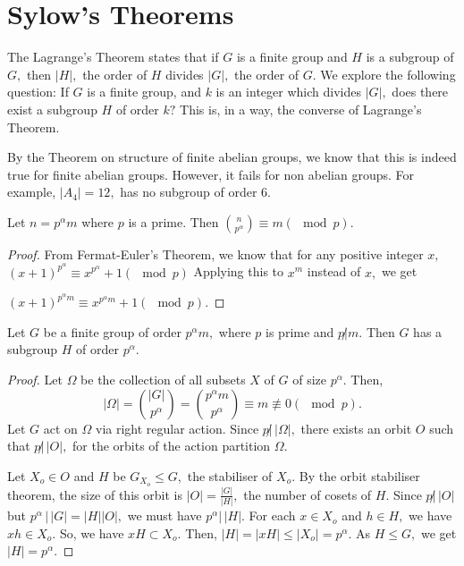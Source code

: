 \section{Sylow's Theorems}
The Lagrange's Theorem states that if $G$ is a finite group and $H$ is a subgroup of $G,$
then $ \lvert H \rvert,$ the order of $H$ divides $ \lvert G \rvert,$ the order of $G.$
We explore the following question: If $G$ is a finite group, and $k$ is an integer
which divides $ \lvert G \rvert ,$ does there exist a subgroup $H$ of order $k?$
This is, in a way, the converse of Lagrange's Theorem.

By the Theorem on structure of finite abelian groups, we know that this is indeed true
for finite abelian groups.
However, it fails for non abelian groups. For example, $ \lvert A_{4} \rvert = 12,$
has no subgroup of order 6.

\begin{lemma}
	Let $ n = p^{\alpha} m$ where $p$ is a prime.
	Then $ \binom{n}{p^{\alpha}} \equiv m (\mod p).$
\end{lemma}

\begin{proof}
	From Fermat-Euler's Theorem, we know that for any positive integer
	$x,$
	$ (x+1)^{p ^\alpha} \equiv x^{p^\alpha} + 1 (\mod p) $	
	Applying this to $x^m $ instead of $x,$ we get

	$ (x+1)^{p ^\alpha m} \equiv x^{p^\alpha m} + 1 (\mod p) .$

\end{proof}

\begin{theorem}
Let $G$ be a finite group of order $p^{\alpha}m,$ where $p$ is prime and $p \not |m.$
Then $G$ has a subgroup $H$ of order $p^{\alpha}.$
\end{theorem}

\begin{proof}
	Let $\Omega$ be the collection of all subsets $X$ of $G$ of size $p^\alpha.$
	Then,
	$$ \lvert \Omega \rvert = \binom{ \lvert G \rvert }{p^\alpha}
	= \binom{p^\alpha m} {p^\alpha }
	\equiv m \not \equiv 0 ( \mod p).$$
	Let $G$ act on $ \Omega $ via right regular action.
	Since $p \not  | \, \lvert \Omega \rvert ,$ there exists an orbit 
	$O$ such that $p \not |\, \lvert O \rvert,$
	for the orbits of the action partition $ \Omega. $

	Let $X_o \in O$ and $H $ be $ G _{X_o} \leq G,$ the stabiliser of $X_o.$
	By the orbit stabiliser theorem, the size of this orbit is
	$ \lvert O \rvert =  \frac{ \lvert G  \rvert }{ \lvert H \rvert },$
	the number of cosets of $H.$
	Since $p \not | \, \lvert O \rvert$
	but $p^\alpha \, | \, \lvert G \rvert = \lvert H \rvert \lvert O \rvert,$
	we must have $p^{\alpha} | \, \lvert H \rvert.$
	For each $ x \in X_o$ and $ h \in H,$ we have $ xh \in X_o.$
	So, we have $x H \subset X_o.$
	Then,
	$ \lvert H \rvert = \lvert x H \rvert \leq \lvert X_o \rvert = p^\alpha.$
	As $H \leq G,$ we get $ \lvert H \rvert = p^\alpha.$

\end{proof}

